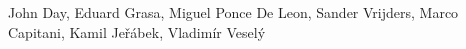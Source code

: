 {\contribfont
    John Day,
    Eduard Grasa,
    Miguel Ponce De Leon,
    Sander Vrijders,
    Marco Capitani,
    Kamil Je\v{r}\'{a}bek,
    Vladim\'{i}r Vesel\'{y}
}

